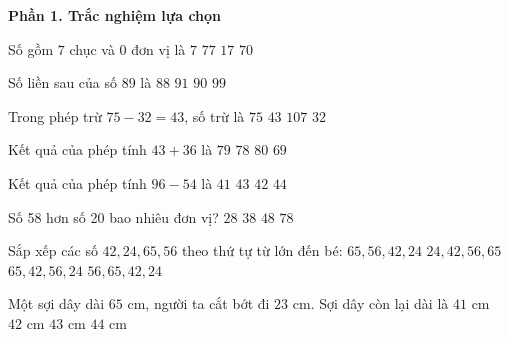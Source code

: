 \textbf{Phần 1. Trắc nghiệm lựa chọn}

\begin{ex} %
Số gồm $7$ chục và $0$ đơn vị là
\choice
{$7$}
{$77$}
{$17$}
{\True $70$}
\end{ex}

\begin{ex} %
Số liền sau của số $89$ là
\choice
{$88$}
{$91$}
{\True $90$}
{$99$}
\end{ex}

\begin{ex} %
Trong phép trừ $75 - 32 = 43$, số trừ là
\choice
{$75$}
{$43$}
{$107$}
{\True $32$}
\end{ex}

\begin{ex} %
Kết quả của phép tính $43 + 36$ là
\choice
{\True $79$}
{$78$}
{$80$}
{$69$}
\end{ex}

\begin{ex} %
Kết quả của phép tính $96 - 54$ là
\choice
{$41$}
{$43$}
{\True $42$}
{$44$}
\end{ex}

\begin{ex} %
Số 58 hơn số 20 bao nhiêu đơn vị?
\choice
{$28$}
{\True $38$}
{$48$}
{$78$}
\end{ex}

\begin{ex} %
Sắp xếp các số $42, 24, 65, 56$ theo thứ tự từ lớn đến bé:
\choice
{\True $65, 56, 42, 24$}
{$24, 42, 56, 65$}
{$65, 42, 56, 24$}
{$56, 65, 42, 24$}
\end{ex}

\begin{ex} %
Một sợi dây dài $65\text{ cm}$, người ta cắt bớt đi $23\text{ cm}$. Sợi dây còn lại dài là
\choice
{$41\text{ cm}$}
{\True $42\text{ cm}$}
{$43\text{ cm}$}
{$44\text{ cm}$}
\end{ex}

